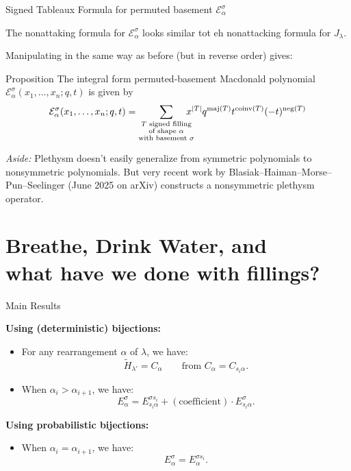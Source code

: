 \documentclass[aspectratio = 1609]{beamer}
\theoremstyle{definition}
\theoremstyle{plain} %
\DeclareMathOperator{\maj}{maj}
\DeclareMathOperator{\coinv}{coinv}
\begin{document}
\begin{frame}{Signed Tableaux Formula for permuted basement \(\mathcal{E}_\alpha^\sigma\)}

  The nonattaking formula for \(\mathcal{E}_\alpha^\sigma\) looks similar tot eh nonattacking formula for \(J_\lambda\).

  \vspace{1em}

  Manipulating in the same way as before (but in reverse order) gives:

  \begin{block}{Proposition}
    The integral form permuted-basement Macdonald polynomial \(\mathcal{E}_\alpha^\sigma(x_1, \dots, x_n; q, t)\) is given by
    \[
      \mathcal{E}_\alpha^\sigma(x_1, \dots, x_n; q, t)
      =
      \sum_{\substack{T \text{ signed filling} \\ \text{of shape } \alpha \\ \text{with basement } \sigma}}
      \mkern-18mu
      x^{|T|}
      q^{\maj(T)}
      t^{\coinv(T)}
      (-t)^{\operatorname{neg}(T)}
    \]
  \end{block}
  
  \vspace{1em}
  \pause

  \textit{Aside:} Plethysm doesn't easily generalize from symmetric polynomials to nonsymmetric polynomials. But very recent work by Blasiak--Haiman--Morse--Pun--Seelinger (June 2025 on arXiv) constructs a nonsymmetric plethysm operator.
  
\end{frame}

\part{Breathe, Drink Water, and \\ what have we done with fillings?}

\begin{frame}{Main Results}

    \textbf{Using (deterministic) bijections:}
    \begin{itemize}
        \item 
        For any rearrangement \(\alpha\) of \(\lambda\), we have:
        \[ \tilde{H}_{\lambda'} = C_{\alpha} \qquad \text{from } C_{\alpha} = C_{s_i \alpha}. \]

        \item
        When \(\alpha_i > \alpha_{i+1}\), we have:
        \[
            E_\alpha^\sigma = 
            E_{s_i \alpha}^{\sigma s_i} +
            (\text{coefficient}) \cdot
            E_{s_i \alpha}^\sigma.
        \]
    \end{itemize}

    \textbf{Using probabilistic bijections:}
    \begin{itemize}
        \item
        When \(\alpha_i = \alpha_{i+1}\), we have:
        \[
            E_\alpha^\sigma = E_\alpha^{\sigma s_i}.
        \]
    \end{itemize}
\end{frame}
\end{document}
